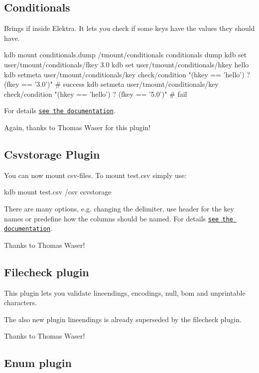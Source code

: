 \subsection*{Conditionals}

Brings {\ttfamily if} inside Elektra. It lets you check if some keys have the values they should have. \begin{DoxyVerb}    kdb mount conditionals.dump /tmount/conditionals conditionals dump
    kdb set user/tmount/conditionals/fkey 3.0
    kdb set user/tmount/conditionals/hkey hello
    kdb setmeta user/tmount/conditionals/key check/condition "(hkey == 'hello') ? (fkey == '3.0')" # success
    kdb setmeta user/tmount/conditionals/key check/condition "(hkey == 'hello') ? (fkey == '5.0')" # fail
\end{DoxyVerb}


For details \href{http://libelektra.org/blob/master/src/plugins/conditionals/}{\tt see the documentation}.

Again, thanks to Thomas Waser for this plugin!

\subsection*{Csvstorage Plugin}

You can now mount csv-\/files. To mount {\ttfamily test.\+csv} simply use\+: \begin{DoxyVerb}kdb mount test.csv /csv csvstorage
\end{DoxyVerb}


There are many options, e.\+g. changing the delimiter, use header for the key names or predefine how the columns should be named. For details \href{http://libelektra.org/blob/master/src/plugins/csvstorage/}{\tt see the documentation}.

Thanks to Thomas Waser!

\subsection*{Filecheck plugin}

This plugin lets you validate lineendings, encodings, null, bom and unprintable characters.

The also new plugin lineendings is already superseded by the filecheck plugin.

Thanks to Thomas Waser!

\subsection*{Enum plugin}

